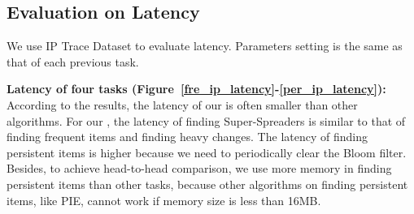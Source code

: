 
{\color{reviewD}
\presub
\subsection{Evaluation on Latency} %
\label{eva_latency}

We use IP Trace Dataset to evaluate latency. Parameters setting is the same as that of each previous task.

\noindent\textbf{Latency of four tasks (Figure~\ref{fre_ip_latency}-\ref{per_ip_latency}):}
According to the results, the latency of our \sketchname{} is often smaller than other algorithms. For our \sketchname{}, the latency of finding Super-Spreaders is similar to that of finding frequent items and finding heavy changes. The latency of finding persistent items is higher because we need to periodically clear the Bloom filter.
Besides, to achieve head-to-head comparison, we use more memory in finding persistent items than other tasks, because other algorithms on finding persistent items, like PIE, cannot work if memory size is less than 16MB.
}